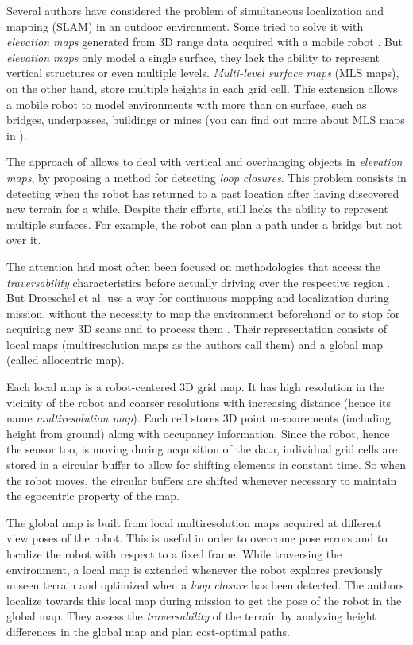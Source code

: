 \documentclass[12pt,a4paper]{report}
\newcommand{\etal}[1]{#1 et al.}
\newcommand{\term}{\textit}
\newcommand{\acronym}{\MakeUppercase}
\begin{document}
	Several authors have considered the problem of simultaneous localization and 
	mapping (\acronym{slam}) in an outdoor environment. Some tried to solve it with 
	\term{elevation maps} generated from \acronym{3d} range data acquired with a 
	mobile robot \cite{Pfaff}. But \term{elevation maps} only model a single surface, 
	they lack the ability to represent vertical structures or even multiple levels.
	\term{Multi-level surface maps} (\acronym{mls} maps), on the other hand, store 
	multiple heights in each grid cell. This extension allows a mobile robot to model 
	environments with more than on surface, such as bridges, underpasses, buildings 
	or mines (you can find out more about \acronym{mls} maps in \cite{Triebel}). 
	\par
	The approach of \cite{Pfaff} allows to deal with vertical and overhanging objects 
	in \term{elevation maps}, by proposing a method for detecting \term{loop closures}. 
	This problem consists in detecting when the robot has returned to a past location 
	after having discovered new terrain for a while. Despite their efforts, 
	\cite{Pfaff} still lacks the ability to represent multiple surfaces. For example, 
	the robot can plan a path under a bridge but not over it.
	\par
	The attention had most often been focused on methodologies that access the 
	\term{traversability} characteristics before actually driving over the respective 
	region \cite{Papadakis}. But \etal{Droeschel} use a way for continuous mapping 
	and localization during mission, without the necessity to map the environment 
	beforehand or to stop for acquiring new \acronym{3d} scans and to process them 
	\cite{Droeschel}. Their representation consists of local maps (multiresolution 
	maps as the authors call them) and a global map (called allocentric map).
	\par
	Each local map is a robot-centered \acronym{3d} grid map. It has high resolution 
	in the vicinity of the robot and coarser resolutions with increasing distance 
	(hence its name \term{multiresolution map}). Each cell stores \acronym{3d} point 
	measurements (including height from ground) along with occupancy information. 
	Since the robot, hence the sensor too, is moving during acquisition of the data, 
	individual grid cells are stored in a circular buffer to allow for shifting 
	elements in constant time. So when the robot moves, the circular buffers are 
	shifted whenever necessary to maintain the egocentric property of the map.
	\par
	The global map is built from local multiresolution maps acquired at different 
	view poses of the robot. This is useful in order to overcome pose errors and to 
	localize the robot with respect to a fixed frame. While traversing the environment, 
	a local map is extended whenever the robot explores previously unseen terrain 
	and optimized when a \term{loop closure} has been detected. The authors localize 
	towards this local map during mission to get the pose of the robot in the global 
	map. They assess the \term{traversability} of the terrain by analyzing height 
	differences in the global map and plan cost-optimal paths.
	\\
	
\end{document}
